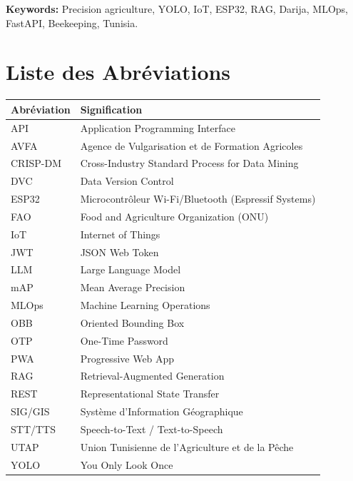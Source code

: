 \documentclass[12pt,a4paper,oneside]{report}
\begin{document}
\medskip\noindent\textbf{Keywords:} Precision agriculture, YOLO, IoT, ESP32, RAG, Darija, MLOps, FastAPI, Beekeeping, Tunisia.

\clearpage

\tableofcontents\clearpage
\listoffigures{}\clearpage
\listoftables{}\clearpage

\chapter*{Liste des Abréviations}\thispagestyle{empty}
\begin{longtable}{@{}lp{10cm}@{}}
\toprule\textbf{Abréviation}&\textbf{Signification}\\\midrule\endhead\bottomrule\endfoot
API     & Application Programming Interface \\
AVFA    & Agence de Vulgarisation et de Formation Agricoles \\
CRISP-DM& Cross-Industry Standard Process for Data Mining \\
DVC     & Data Version Control \\
ESP32   & Microcontrôleur Wi-Fi/Bluetooth (Espressif Systems) \\
FAO     & Food and Agriculture Organization (ONU) \\
IoT     & Internet of Things \\
JWT     & JSON Web Token \\
LLM     & Large Language Model \\
mAP     & Mean Average Precision \\
MLOps   & Machine Learning Operations \\
OBB     & Oriented Bounding Box \\
OTP     & One-Time Password \\
PWA     & Progressive Web App \\
RAG     & Retrieval-Augmented Generation \\
REST    & Representational State Transfer \\
SIG/GIS & Système d'Information Géographique \\
STT/TTS & Speech-to-Text / Text-to-Speech \\
UTAP    & Union Tunisienne de l'Agriculture et de la Pêche \\
YOLO    & You Only Look Once \\
\bottomrule
\end{longtable}
\clearpage
\end{document}
